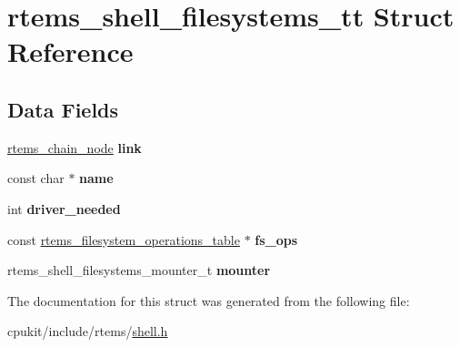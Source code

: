 \hypertarget{structrtems__shell__filesystems__tt}{}\section{rtems\+\_\+shell\+\_\+filesystems\+\_\+tt Struct Reference}
\label{structrtems__shell__filesystems__tt}
\subsection*{Data Fields}
\begin{DoxyCompactItemize}
\item 
\mbox{\label{structrtems__shell__filesystems__tt_a3f26741d18562ce3a0a6751df3176625}} 
\mbox{\hyperlink{structChain__Node__struct}{rtems\+\_\+chain\+\_\+node}} {\bfseries link}
\item 
\mbox{\label{structrtems__shell__filesystems__tt_acb3160939836751d3d49581efcf16425}} 
const char $\ast$ {\bfseries name}
\item 
\mbox{\label{structrtems__shell__filesystems__tt_a533dce2db00f81b31581c7508afee7fc}} 
int {\bfseries driver\+\_\+needed}
\item 
\mbox{\label{structrtems__shell__filesystems__tt_a9675bd29c2cd6fd9f1298bf65cff8461}} 
const \mbox{\hyperlink{struct__rtems__filesystem__operations__table}{rtems\+\_\+filesystem\+\_\+operations\+\_\+table}} $\ast$ {\bfseries fs\+\_\+ops}
\item 
\mbox{\label{structrtems__shell__filesystems__tt_afd12c866185db730f6ce208ad021242c}} 
rtems\+\_\+shell\+\_\+filesystems\+\_\+mounter\+\_\+t {\bfseries mounter}
\end{DoxyCompactItemize}


The documentation for this struct was generated from the following file\+:\begin{DoxyCompactItemize}
\item 
cpukit/include/rtems/\mbox{\hyperlink{shell_8h}{shell.\+h}}\end{DoxyCompactItemize}
